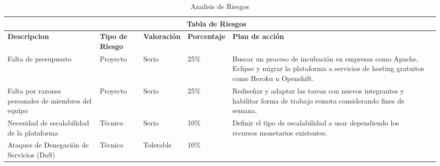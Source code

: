     \begin{table}[b!]
    \centering
      \begin{tabular}{|p{3cm}|lllll}
        \hline
        \multicolumn{5}{|c|}{{\bf Tabla de Riesgos}} \\ 
        \hline
          \multicolumn{1}{|p{3cm}|}{{\bf Descripcion}} & 
          \multicolumn{1}{p{2cm}|}{{\bf Tipo de Riesgo}} & 
          \multicolumn{1}{p{2cm}|}{{\bf Valoración}} & 
          \multicolumn{1}{p{2cm}|}{{\bf Porcentaje}} & 
          \multicolumn{1}{p{5cm}|}{{\bf Plan de acción}} \\ 
        \hline
          \multicolumn{1}{|p{3cm}|}{Falta de presupuesto} & 
          \multicolumn{1}{p{2cm}|}{Proyecto} & 
          \multicolumn{1}{p{2cm}|}{Serio} & 
          \multicolumn{1}{p{2cm}|}{25\%} & 
          \multicolumn{1}{p{5cm}|}{Buscar un proceso de incubación en empresas como Apache, Eclipse y migrar la plataforma a servicios de hosting gratuitos como Heroku u Openshift.} \\ 
        \hline
          \multicolumn{1}{|p{3cm}|}{Falta por razones personales de miembros del equipo} & 
          \multicolumn{1}{p{2cm}|}{Proyecto} &
          \multicolumn{1}{p{2cm}|}{Serio} & 
          \multicolumn{1}{p{2cm}|}{25\%} & 
          \multicolumn{1}{p{5cm}|}{Rediseñar y adaptar las tareas con nuevos integrantes y habilitar forma de trabajo remota considerando fines de semana.} \\ 
        \hline
          \multicolumn{1}{|p{3cm}|}{Necesidad de escalabilidad de la plataforma} & 
          \multicolumn{1}{p{2cm}|}{Técnico} & 
          \multicolumn{1}{p{2cm}|}{Serio} & 
          \multicolumn{1}{p{2cm}|}{10\%} & 
          \multicolumn{1}{p{5cm}|}{Definir el tipo de escalabilidad a usar dependiendo los recursos monetarios existentes.} \\ 
        \hline
          \multicolumn{1}{|p{3cm}|}{Ataques de Denegación de Servicios (DoS)} & 
          \multicolumn{1}{p{2cm}|}{Técnico} & 
          \multicolumn{1}{p{2cm}|}{Tolerable} & 
          \multicolumn{1}{p{2cm}|}{10\%} & 
          \multicolumn{1}{p{5cm}|}{} \\ 
        \hline
      \end{tabular}
      \caption{Analisis de Riesgos}
      \label{Analisis de riesgos}
    \end{table}
    \clearpage